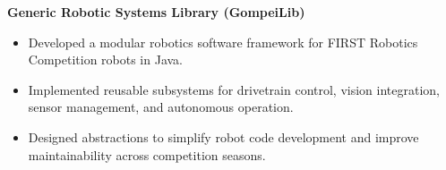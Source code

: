 \textbf{Generic Robotic Systems Library (GompeiLib)}
\begin{itemize}
  \item Developed a modular robotics software framework for FIRST Robotics Competition robots in Java.
  \item Implemented reusable subsystems for drivetrain control, vision integration, sensor management, and autonomous operation.
  \item Designed abstractions to simplify robot code development and improve maintainability across competition seasons.
\end{itemize}
